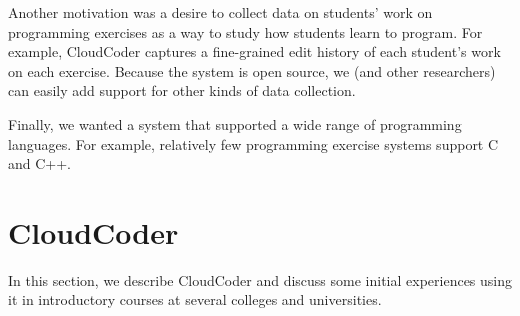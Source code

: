 \documentclass{sig-alternate}
\begin{document}
Another motivation was a desire to collect data on students' work
on programming exercises as a way to study how students learn to program.
For example, CloudCoder captures a fine-grained edit history of each
student's work on each exercise.  Because the system is open source,
we (and other researchers) can easily add support for other kinds of data collection.

Finally, we wanted a system that supported a wide range of programming
languages.  For example, relatively few programming exercise systems
support C and C++.


\section{CloudCoder}

In this section, we describe CloudCoder and discuss some initial experiences
using it in introductory courses at several colleges and universities.


% 
%


\end{document}
